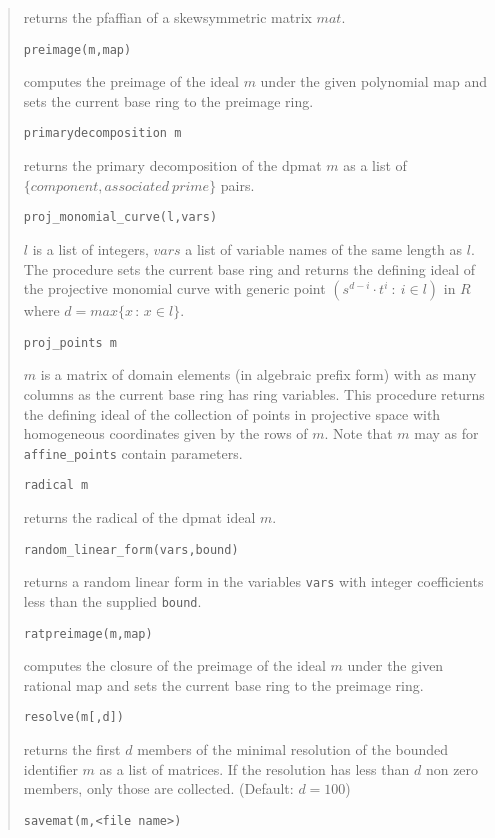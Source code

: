 \documentclass[a4paper,11pt]{article}
\newcommand{\pbx}[1]{\mbox{}\hfill \parbox[t]{12cm}{#1} \pagebreak[3]}
\begin{document}
\begin{quote}
\pbx{returns the pfaffian of a skewsymmetric matrix $mat$.}

\verb|preimage(m,map)| 

\pbx{computes the preimage of the ideal $m$ under the given
polynomial map and sets the current base ring to the preimage ring.}

\verb|primarydecomposition m| 

\pbx{returns the primary decomposition of the dpmat $m$ as a list of
$\{component, associated\ prime\}$ pairs.}

\verb|proj_monomial_curve(l,vars)|

\pbx{$l$ is a list of integers, $vars$ a list of variable names of the
same length as $l$. The procedure sets the current base ring and
returns the defining ideal of the projective monomial curve with
generic point \mbox{$(s^{d-i}\cdot t^i\ :\ i\in l)$} in $R$ where $d=max\{
x\, :\, x\in l\}$.}

\verb|proj_points m| 

\pbx{$m$ is a matrix of domain elements (in algebraic prefix form)
with as many columns as the current base ring has ring variables. This
procedure returns the defining ideal of the collection of points in
projective space with homogeneous coordinates given by the rows of
$m$. Note that $m$ may as for {\tt affine\_points} contain
parameters.}  

\verb|radical m| 

\pbx{returns the radical of the dpmat ideal $m$.}

\verb|random_linear_form(vars,bound)| 

\pbx{returns a random linear form in the variables {\tt vars} with integer
coefficients less than the supplied {\tt bound}.}

\verb|ratpreimage(m,map)| 

\pbx{computes the closure of the preimage of the ideal $m$ under the
given rational map and sets the current base ring to the preimage
ring.}

\verb|resolve(m[,d])| 

\pbx{returns the first $d$ members of the minimal resolution of the
bounded identifier $m$ as a list of matrices. If the resolution has
less than $d$ non zero members, only those are collected. (Default:
$d=100$)}

\verb|savemat(m,<file name>)| 


\end{quote}
\end{document}
